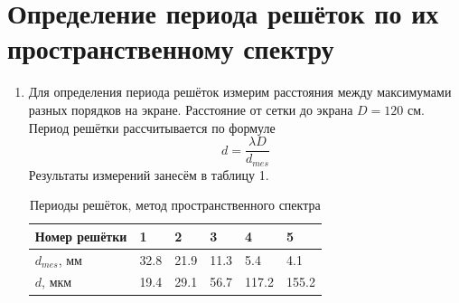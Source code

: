 \documentclass[12pt]{article}
\begin{document}
\section{Определение периода решёток по их пространственному спектру}
\begin{enumerate}
    \item Для определения периода решёток измерим расстояния между максимумами разных порядков на экране. Расстояние от сетки до экрана $D = 120$ см. Период решётки рассчитывается по формуле 
    \begin{equation}
        d = \frac{\lambda D}{d_{mes}}
    \end{equation}
    Результаты измерений занесём в таблицу 1.
    
        \begin{table}[h]
    \centering
    \begin{center}
    \caption{Периоды решёток, метод пространственного спектра}
    \end{center}
    \vspace{0.1cm}
    \label{tab:my_label}
    \begin{tabular}{ |p{3 cm}||p{1cm}|p{1cm}|p{1cm}|p{1cm}|p{1cm}|}
 \hline
Номер решётки & 1 & 2 & 3 & 4 & 5\\
 \hline
 $d_{mes}$, мм & 32.8 & 21.9 & 11.3 & 5.4 & 4.1 \\
 \hline
 $d$, мкм & 19.4 & 29.1 & 56.7 & 117.2 & 155.2\\

 \hline
 
\end{tabular}
\end{table}
\end{enumerate}
\end{document}
